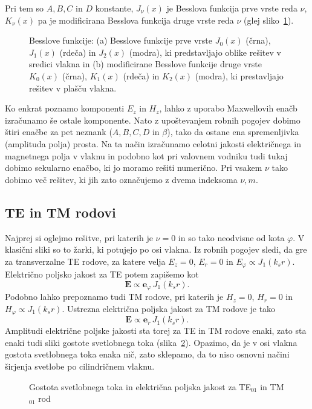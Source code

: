 Pri tem so $A,B,C$ in $D$ konstante, $J_\nu(x)$ je Besslova funkcija prve vrste reda 
$\nu$, $K_\nu(x)$ pa je modificirana Besslova funkcija druge vrste reda $\nu$ (glej sliko~\ref{fig:J01}). 
\begin{figure}[h]
\centering
\def\svgwidth{140truemm} 
 
\caption{Besslove funkcije: (a) Besslove funkcije prve vrste 
$J_0(x)$ (črna), $J_1(x)$ (rdeča) in $J_2(x)$ (modra), 
ki predstavljajo oblike rešitev v sredici vlakna in (b)
modificirane Besslove funkcije druge vrste $K_0(x)$ (črna), $K_1(x)$ (rdeča) in $K_2(x)$ (modra), 
ki prestavljajo rešitev v plašču vlakna.}
\label{fig:J01}
\end{figure}

Ko enkrat poznamo komponenti $E_z$ in $H_z$, lahko z uporabo Maxwellovih enačb izračunamo še ostale
komponente. Nato z upoštevanjem robnih pogojev dobimo štiri enačbe za pet neznank ($A,B,C,D$ in $\beta$),
tako da ostane ena spremenljivka (amplituda polja) prosta. Na ta način izračunamo celotni 
jakosti električnega in magnetnega polja v vlaknu in podobno kot pri valovnem vodniku 
tudi tukaj dobimo sekularno enačbo, ki jo moramo rešiti numerično. Pri vsakem $\nu$ tako dobimo več
rešitev, ki jih zato označujemo z dvema indeksoma $\nu,m$. 

\subsection*{TE in TM rodovi}
Najprej si oglejmo rešitve, pri katerih je $\nu=0$ in so tako neodvisne od kota $\varphi$. 
V klasični sliki so to žarki, ki potujejo po osi vlakna. Iz robnih pogojev sledi, da 
gre za transverzalne TE rodove, za katere velja $E_z=0$, $E_r=0$ in $E_\varphi \propto J_1(k_sr)$.
Električno poljsko jakost za TE potem zapišemo kot 
\begin{equation}
\mathbf{E} \propto \mathbf{e}_\varphi \, J_1(k_s r).
\end{equation}
Podobno lahko prepoznamo tudi TM rodove, pri katerih je $H_z=0$, $H_r=0$ in $H_\varphi \propto J_1(k_sr)$.
Ustrezna električna poljska jakost za TM rodove je tako 
\begin{equation}
\mathbf{E} \propto \mathbf{e}_r \, J_1(k_s r).
\end{equation}
Amplitudi električne poljske jakosti sta torej za TE in TM rodove enaki, zato
sta enaki tudi sliki gostote svetlobnega toka (slika~\ref{fig:TE01}). Opazimo, da je v osi
vlakna gostota svetlobnega toka enaka nič, zato sklepamo, da to niso osnovni načini 
širjenja svetlobe po cilindričnem vlaknu. 
\begin{figure}[h]
\centering
\def\svgwidth{100truemm} 

\caption{Gostota svetlobnega toka in električna poljska jakost za TE$_{01}$ in TM$_{01}$ rod}
\label{fig:TE01}
\end{figure}

